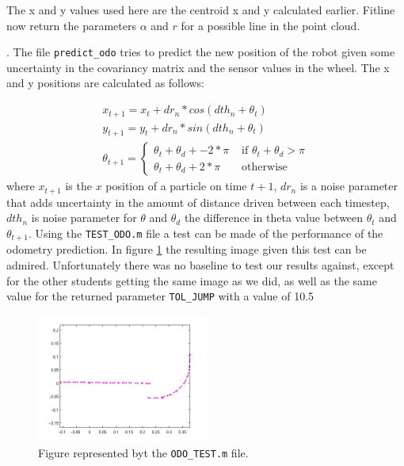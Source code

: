 \documentclass[a4paper, 12pt]{article}
\begin{document}
The x and y values used here are the centroid x and y calculated earlier.
Fitline now return the parameters $\alpha$ and $r$ for a possible line in the
point cloud.

. The file \texttt{predict\_odo} tries to predict the new position of the robot
given some uncertainty in the covariancy matrix and the sensor values in the
wheel.
The x and y positions are calculated as follows:

\begin{align*}
    x_{t+1} = x_{t} + dr_n * cos(dth_n + \theta_t)\\
    y_{t+1} = y_{t} + dr_n * sin(dth_n + \theta_t)\\
\theta_{t+1} = \left\{ \begin{array}{rl}
 \theta_t + \theta_d + -2*\pi &\mbox{ if $\theta_t + \theta_d > \pi$} \\
 \theta_t + \theta_d + 2*\pi&\mbox{ otherwise}
\end{array} \right.
\end{align*}
where $x_{t+1}$ is the $x$ position of a particle on time $t+1$, $dr_n$ is a noise
parameter that adds uncertainty in the amount of distance driven between each
timestep, $dth_n$ is noise parameter for $\theta$ and $\theta_d$ the
difference in theta value between $\theta_t$  and $\theta_{t+1}$.
Using the \texttt{TEST\_ODO.m} file a test can be made of the performance of the
odometry prediction. In figure \ref{fig:odo_test} the resulting image given this test
can be admired. Unfortunately there was no baseline to test our results against,
except for the other students getting the same image as we did, as well as the
same value for the returned parameter \texttt{TOL\_JUMP} with a value of 10.5

\begin{figure}[!ht]
\centering
  \includegraphics[width=0.5\textwidth]{Odo_test.jpg}
  \caption{Figure represented byt the \texttt{ODO\_TEST.m} file. } 
  \label{fig:odo_test}
\end{figure}
\end{document}
